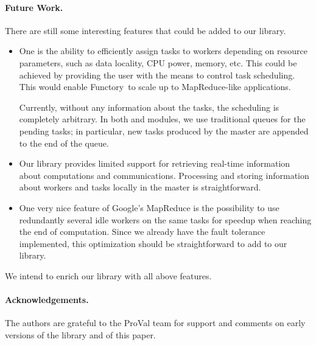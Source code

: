 \documentclass{llncs}
\newcommand{\functory}{\textsf{Functory}}
\begin{document}
\paragraph{Future Work.}
There are still some interesting features that could be added to our
library. 
\begin{itemize}
\item 
  One is the ability to efficiently assign tasks to workers depending
  on resource parameters, such as data locality, CPU power, memory,
  etc. This could be achieved by providing the user with the means to control
  task scheduling.  This would enable \functory\ to scale up to
  MapReduce-like applications.

  Currently, without any information about the tasks, the scheduling
  is completely arbitrary. In both  and 
  modules, we use traditional queues for the pending tasks; in
  particular, new tasks produced by the master are appended to the end
  of the queue.

\item
  Our library provides limited support for retrieving real-time
  information about computations and communications. Processing and storing
  information about workers and tasks locally in the master is
  straightforward.
 
\item 
  One very nice feature of Google's MapReduce is the possibility to
  use redundantly several idle workers on the same tasks
  for speedup when reaching the end of computation.
  Since we already have the fault tolerance implemented, this
  optimization should be straightforward to add to our library.
\end{itemize}
We intend to enrich our library with all above features.



\paragraph{Acknowledgements.}
The authors are grateful to the ProVal team for support and comments
on early versions of the library and of this paper.



\end{document}
